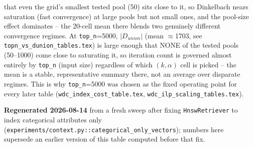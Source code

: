\begin{table}[t]
\begin{threeparttable}
\begin{tablenotes}
  that even the grid's smallest tested pool (50) sits close to it, so Dinkelbach nears saturation
  (fast convergence) at large pools but not small ones, and the pool-size effect dominates -- the
  20-cell mean there blends two genuinely different convergence regimes. At \texttt{top\_n}=5000,
  $|D_{union}|$ (mean $\approx$1703, see \texttt{topn\_vs\_dunion\_tables.tex}) is large enough
  that NONE of the tested pools (50--1000) come close to saturating it, so iteration count is
  governed almost entirely by \texttt{top\_n} (input size) regardless of which $(k,\alpha)$ cell is
  picked -- the mean is a stable, representative summary there, not an average over disparate
  regimes. This is why \texttt{top\_n}=5000 was chosen as the fixed operating point for every later
  table (\texttt{wdc\_index\_cost\_table.tex}, \texttt{wdc\_ilp\_scaling\_tables.tex}).
\item[d] \textbf{Regenerated 2026-08-14} from a fresh sweep after fixing \texttt{HnswRetriever} to
  index categorical attributes only (\texttt{experiments/context.py::categorical\_only\_vectors});
  numbers here supersede an earlier version of this table computed before that fix.
\end{tablenotes}
\end{threeparttable}
\end{table}

